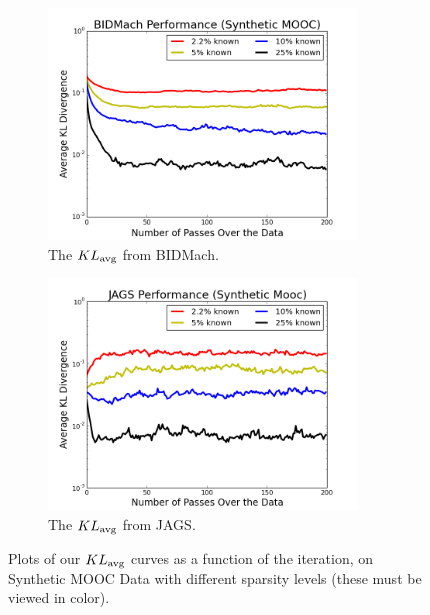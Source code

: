 \documentclass{article} %
\begin{document}
\begin{figure}[t]
\centering
\begin{subfigure}{.5\textwidth}
  \centering
  \includegraphics[width=0.9\textwidth]{fig_diff_sparsity_bidmach}
  \caption{The $KL_{\rm avg}$ from BIDMach.}
  \label{fig:kl_bidmach_mooc}
\end{subfigure}%
\begin{subfigure}{.5\textwidth}
  \centering
  \includegraphics[width=0.9\textwidth]{fig_diff_sparsity_jags}
  \caption{The $KL_{\rm avg}$ from JAGS.}
  \label{fig:kl_jags_mooc}
\end{subfigure}
\caption{Plots of our $KL_{\rm avg}$ curves as a function of the iteration, on Synthetic MOOC Data
with different sparsity levels (these must be viewed in color).}
\label{fig:second_set}
\end{figure}
\end{document}
